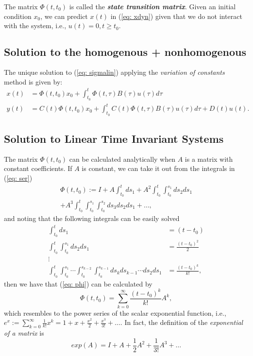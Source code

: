 \documentclass[11pt,a4paper,titlepage]{article}
\begin{document}
The matrix $\Phi(t,t_0)$ is called the \textbf{\emph{state transition matrix}}. Given an initial condition $x_0$, we can predict $x(t)$ in (\ref{eq: xdyn}) given that we do not interact with the system, i.e., $u(t) = 0, t\geq t_0$.

\subsection{Solution to the homogenous + nonhomogenous}
The unique solution to (\ref{eq: sigmalin}) applying the \emph{variation of constants} method is given by:
\begin{align}
	x(t) &= \Phi(t,t_0)x_0 + \int_{t_0}^t \Phi(t,\tau)B(\tau)u(\tau)d\tau \label{eq: solx} \\
	y(t) &= C(t)\Phi(t,t_0)x_0 + \int_{t_0}^t C(t)\Phi(t,\tau)B(\tau)u(\tau)d\tau + D(t)u(t). \label{eq: soly}
\end{align}

\subsection{Solution to Linear Time Invariant Systems}

The matrix $\Phi(t,t_0)$ can be calculated analytically when $A$ is a matrix with constant coefficients. If $A$ is constant, we can take it out from the integrals in (\ref{eq: ser})
\begin{align}
	\Phi(t,t_0) := I + A \int_{t_0}^t ds_1 + A^2 \int_{t_0}^t \int_{t_0}^{s_1} ds_2ds_1 \nonumber \\ + A^3 \int_{t_0}^t \int_{t_0}^{s_1} \int_{t_0}^{s_2} ds_3ds_2ds_1 + \dots \label{eq: phi},
\end{align}
and noting that the following integrals can be easily solved
\begin{align}
	\int_{t_0}^t ds_1 &= (t-t_0) \nonumber \\
	\int_{t_0}^t\int_{t_0}^{s_1} ds_2ds_1 &= \frac{(t-t_0)^2}{2} \nonumber \\
	\vdots \nonumber \\
	\int_{t_0}^t\int_{t_0}^{s_1} \cdots \int_{t_0}^{s_{k-2}}\int_{t_0}^{s_{k-1}}ds_k ds_{k-1} \cdots ds_2ds_1 &= \frac{(t-t_0)^k}{k!}, \nonumber
\end{align}
then we have that (\ref{eq: phi}) can be calculated by
\begin{equation}
	\Phi(t,t_0) = \sum_{k=0}^{\infty} \frac{(t-t_0)^k}{k!}A^k,
\end{equation}
which resembles to the power series of the scalar exponential function, i.e., $e^x := \sum_{k=0}^{\infty}\frac{1}{k!}x^k = 1 + x + \frac{x^2}{2} + \frac{x^3}{3!} + \dots $. In fact, the definition of the \emph{exponential of a matrix} is
\begin{equation}
	exp(A) = I + A + \frac{1}{2} A^2 + \frac{1}{3!} A^3 + \dots
\end{equation}
\end{document}
